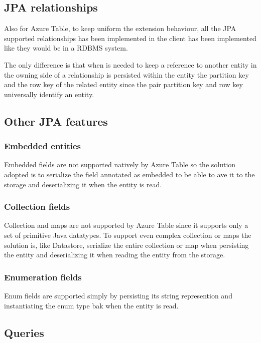 \subsection{JPA relationships}
Also for Azure Table, to keep uniform the extension behaviour, all the JPA supported relationships has been implemented in the client has been implemented like they would be in a RDBMS system.

The only difference is that when is needed to keep a reference to another entity in the owning side of a relationship is persisted within the entity the partition key and the row key of the related entity since the pair partition key and row key universally identify an entity.

\subsection{Other JPA features}

\subsubsection{Embedded entities}
Embedded fields are not supported natively by Azure Table so the solution adopted is to serialize the field annotated as embedded to be able to ave it to the storage and deserializing it when the entity is read.

\subsubsection{Collection fields}
Collection and maps are not supported by Azure Table since it supports only a set of primitive Java datatypes.
To support even complex collection or maps the solution is, like Datastore, serialize the entire collection or map when persisting the entity and deserializing it when reading the entity from the storage.

\subsubsection{Enumeration fields}
Enum fields are supported simply by persisting its string represention and instantiating the enum type bak when the entity is read.

\subsection{Queries}

